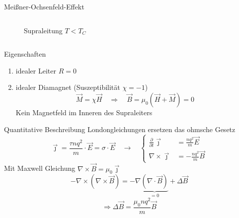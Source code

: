 \begin{frame}{Meißner-Ochsenfeld-Effekt}
\begin{columns}
\begin{column}{0.49\textwidth}
\begin{figure}
    \caption{Supraleitung $T < T_{C}$}
    \label{fig: bfeld_supraleitung}
  \end{figure}
\end{column}
\end{columns}
\end{frame}

\begin{frame}{Eigenschaften}
  \begin{enumerate}
    \item idealer Leiter $R = 0$
    \item idealer Diamagnet (Suszeptibilität $\chi = -1$)
    \begin{equation*}
      \vec{M} = \chi \vec{H} \quad \Rightarrow \quad \vec{B} = \mu_0 (\vec{H} + \vec{M}) = 0
    \end{equation*}
    Kein Magnetfeld im Inneren des Supraleiters
  \end{enumerate}

\end{frame}
\begin{frame}{Quantitative Beschreibung}
Londongleichungen ersetzen das ohmsche Gesetz
\begin{equation*}
  \vec{\jmath} = \frac{\tau n q^2}{m}\cdot \vec{E} = \sigma\cdot \vec{E}\quad  \longrightarrow \quad
  \begin{cases}
    \frac{\partial }{\partial t}\vec{\jmath} &= \frac{nq^2}{m}\vec{E} \\
    \nabla \times \vec{\jmath} &= - \frac{n q^2}{m} \vec{B}
  \end{cases}
\end{equation*}
\pause
Mit Maxwell Gleichung $\nabla \times \vec{B} = \mu_0 \vec{\jmath}$
\begin{equation*}
-\nabla \times (\nabla \times \vec{B}) = -\nabla\underbrace{(\nabla \cdot \vec{B})}_{= 0} + \Delta \vec{B}
\end{equation*}
\begin{equation*}
\Rightarrow  \Delta \vec{B} = \frac{\mu_0 n q^2}{m}\vec{B}
\end{equation*}
\end{frame}

